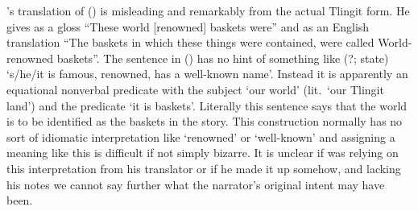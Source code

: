 \citeauthor{swanton:1909}’s translation of (\lastx) is misleading and remarkably from the actual Tlingit form.
He gives as a gloss “These world [renowned] baskets were” and as an English translation “The baskets in which these things were contained, were called World-renowned baskets”.
The sentence in (\lastx) has no hint of something like  (?; state) ‘s/he/it is famous, renowned, has a well-known name’.
Instead it is apparently an equational nonverbal predicate with the subject  ‘our world’ (lit.\ ‘our Tlingit land’) and the predicate  ‘it is baskets’.
Literally this sentence says that the world is to be identified as the baskets in the story.
This construction normally has no sort of idiomatic interpretation like ‘renowned’ or ‘well-known’ and assigning a meaning like this is difficult if not simply bizarre.
It is unclear if \citeauthor{swanton:1909} was relying on this interpretation from his translator or if he made it up somehow, and lacking his notes we cannot say further what the narrator’s original intent may have been.
